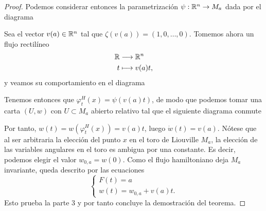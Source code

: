 \begin{proof}
   Podemos considerar entonces la parametrización $\psi:\mathbb{R}^n\rightarrow M_a$ dada por el diagrama
  \begin{center}
   \end{center}
   Sea el vector $v(a)\in \mathbb{R}^n$ tal que $\zeta(v(a))=(1,0,\dots,0)$. Tomemos ahora un flujo rectilíneo
   \begin{align*}
      \mathbb{R}&\longrightarrow \mathbb{R}^n\\ 
       t &\longmapsto  v(a)t,
     \end{align*}
   y veamos su comportamiento en el diagrama 
   \begin{center}
    \end{center}
    Tenemos entonces que $\varphi_t^H(x)=\psi(v(a)t)$, de modo que podemos tomar una carta $(U,w)$ con $U\subset M_a$ abierto relativo tal que el siguiente diagrama conmute
    \begin{center}
     \end{center}
     Por tanto, $w(t)=w(\varphi_t^H(x))=v(a)t$, luego $\dot w(t)=v(a)$. Nótese que al ser arbitraria la elección del punto $x$ en el toro de Liouville $M_a$, la elección de las variables angulares en el toro es ambigua por una constante. Es decir, podemos elegir el valor $w_{0,a}=w(0)$. Como el flujo hamiltoniano deja $M_a$ invariante, queda descrito por las ecuaciones
 \begin{equation*}
   \begin{cases}
     F(t)=a \\
     w(t)=w_{0,a}+v(a)t.
   \end{cases}
 \end{equation*}
Esto prueba la parte $3$ y por tanto concluye la demostración del teorema.
 \end{proof}

